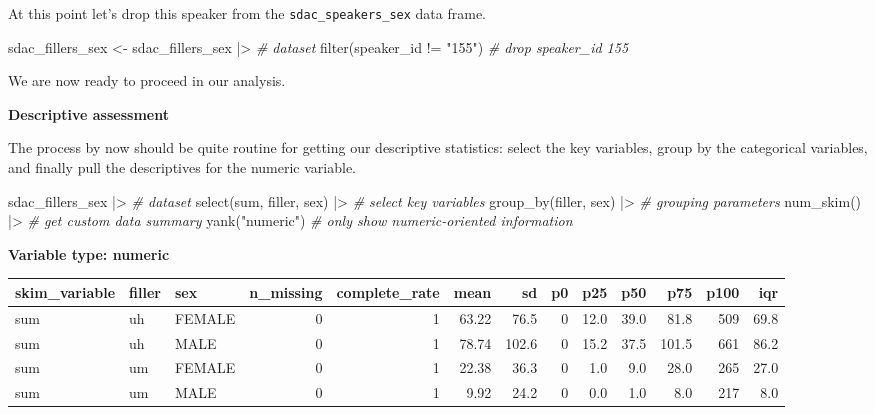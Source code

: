 \documentclass[
  letterpaper,
]{latex/krantz}
\newenvironment{Shaded}{\begin{snugshade}}{\end{snugshade}}
\newcommand{\CommentTok}[1]{\textcolor[rgb]{0.00,0.00,0.00}{\textit{#1}}}
\newcommand{\FunctionTok}[1]{\textcolor[rgb]{0.00,0.00,0.00}{#1}}
\newcommand{\NormalTok}[1]{\textcolor[rgb]{0.00,0.00,0.00}{#1}}
\newcommand{\OtherTok}[1]{\textcolor[rgb]{0.00,0.00,0.00}{#1}}
\newcommand{\SpecialCharTok}[1]{\textcolor[rgb]{0.00,0.00,0.00}{#1}}
\newcommand{\StringTok}[1]{\textcolor[rgb]{0.00,0.00,0.00}{#1}}
\begin{document}
At this point let's drop this speaker from the
\texttt{sdac\_speakers\_sex} data frame.

\begin{Shaded}
\begin{Highlighting}[]
\NormalTok{sdac\_fillers\_sex }\OtherTok{\textless{}{-}} 
\NormalTok{  sdac\_fillers\_sex }\SpecialCharTok{|\textgreater{}} \CommentTok{\# dataset}
  \FunctionTok{filter}\NormalTok{(speaker\_id }\SpecialCharTok{!=} \StringTok{"155"}\NormalTok{) }\CommentTok{\# drop speaker\_id 155}
\end{Highlighting}
\end{Shaded}

We are now ready to proceed in our analysis.

\textbf{Descriptive assessment}

The process by now should be quite routine for getting our descriptive
statistics: select the key variables, group by the categorical
variables, and finally pull the descriptives for the numeric variable.

\begin{Shaded}
\begin{Highlighting}[]
\NormalTok{sdac\_fillers\_sex }\SpecialCharTok{|\textgreater{}} \CommentTok{\# dataset}
  \FunctionTok{select}\NormalTok{(sum, filler, sex) }\SpecialCharTok{|\textgreater{}} \CommentTok{\# select key variables}
  \FunctionTok{group\_by}\NormalTok{(filler, sex) }\SpecialCharTok{|\textgreater{}} \CommentTok{\# grouping parameters}
  \FunctionTok{num\_skim}\NormalTok{() }\SpecialCharTok{|\textgreater{}} \CommentTok{\# get custom data summary}
  \FunctionTok{yank}\NormalTok{(}\StringTok{"numeric"}\NormalTok{) }\CommentTok{\# only show numeric{-}oriented information}
\end{Highlighting}
\end{Shaded}

\textbf{Variable type: numeric}

\begin{tabular}{l|l|l|r|r|r|r|r|r|r|r|r|r}
\hline
skim\_variable & filler & sex & n\_missing & complete\_rate & mean & sd & p0 & p25 & p50 & p75 & p100 & iqr\\
\hline
sum & uh & FEMALE & 0 & 1 & 63.22 & 76.5 & 0 & 12.0 & 39.0 & 81.8 & 509 & 69.8\\
\hline
sum & uh & MALE & 0 & 1 & 78.74 & 102.6 & 0 & 15.2 & 37.5 & 101.5 & 661 & 86.2\\
\hline
sum & um & FEMALE & 0 & 1 & 22.38 & 36.3 & 0 & 1.0 & 9.0 & 28.0 & 265 & 27.0\\
\hline
sum & um & MALE & 0 & 1 & 9.92 & 24.2 & 0 & 0.0 & 1.0 & 8.0 & 217 & 8.0\\
\hline
\end{tabular}
\end{document}
